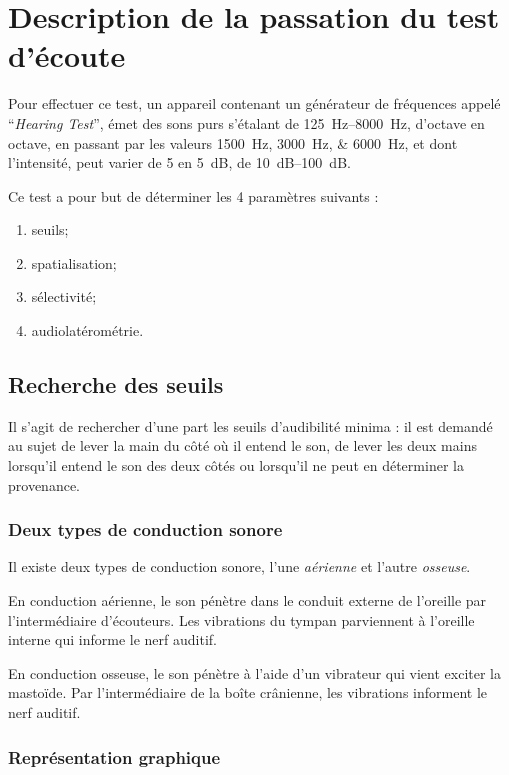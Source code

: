 \autocite[p. 43]{roque:lecoute}

\section{Description de la passation du test d'écoute}
\label{passation}

Pour effectuer ce test, un appareil contenant un générateur de fréquences appelé ``\emph{Hearing Test}'', émet des sons purs s'étalant de \SIrange{125}{8000}{\Hz}, d'octave en octave, en passant par les valeurs
\SIlist{1500;3000;6000}{\Hz}, et dont l'intensité, peut varier de 5 en \SI{5}{\dB}, de \SIrange{10}{100}{\dB}. 

Ce test a pour but de déterminer les 4 paramètres suivants : 
\begin{enumerate}
\item seuils;
\item spatialisation;
\item sélectivité;
\item audiolatérométrie.
\end{enumerate}

\subsection{Recherche des seuils}

Il s'agit de rechercher d'une part les seuils d'audibilité
minima : il est demandé au sujet de lever la main du côté
où il entend le son, de lever les deux mains lorsqu'il entend le son
des deux côtés ou lorsqu'il ne peut en déterminer la provenance.

\subsubsection{Deux types de conduction sonore}
Il existe deux types de conduction sonore, l'une \emph{aérienne} et l'autre \emph{osseuse}.

En conduction aérienne, le son pénètre dans le conduit externe de
l'oreille par l'intermédiaire d'écouteurs. Les vibrations du tympan
parviennent à l'oreille interne qui informe le nerf auditif.

En conduction osseuse, le son pénètre à l'aide d'un
vibrateur qui vient exciter la mastoïde. Par l'intermédiaire de la
boîte crânienne, les vibrations informent le nerf auditif.

\subsubsection{Représentation graphique}

